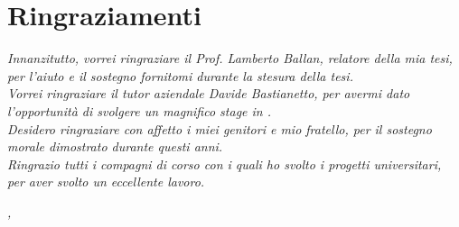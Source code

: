 
\cleardoublepage
{}
{}

\bigskip

\begingroup
\let\clearpage\relax
\let\cleardoublepage\relax
\let\cleardoublepage\relax

\chapter*{Ringraziamenti}

\noindent \textit{Innanzitutto, vorrei ringraziare il Prof. Lamberto Ballan, relatore della mia tesi, per l'aiuto e il sostegno fornitomi durante la stesura della tesi.}\\
\noindent \textit{Vorrei ringraziare il tutor aziendale Davide Bastianetto, per avermi dato l'opportunità di svolgere un magnifico stage in \company{}.}\\
\noindent \textit{Desidero ringraziare con affetto i miei genitori e mio fratello, per il sostegno morale dimostrato durante questi anni.}\\
\noindent \textit{Ringrazio tutti i compagni di corso con i quali ho svolto i progetti universitari, per aver svolto un eccellente lavoro.}\\

\bigskip

\noindent\textit{\myLocation, \myTime}
\hfill \myName

\endgroup

